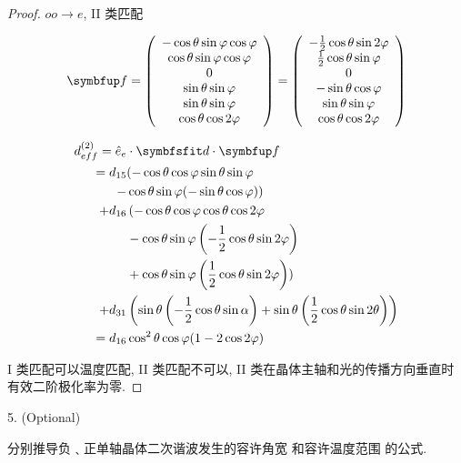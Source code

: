 \begin{proof}
$oo\rightarrow e$, II 类匹配

$$
\Vect{f}=\left(\begin{array}{c}
{-\cos \theta \sin \varphi \cos \varphi} \\
{\cos \theta \sin \varphi \cos \varphi} \\
{0} \\
{\sin \theta \sin \varphi} \\
{\sin \theta \sin \varphi} \\
{\cos \theta \cos 2 \varphi}
\end{array}\right)=\left(\begin{array}{c}
{-\frac{1}{2} \cos \theta \sin 2 \varphi} \\
{\frac{1}{2} \cos \theta \sin \varphi} \\ 
0\\
{-\sin \theta \cos \varphi} \\
{\sin \theta \sin \varphi} \\
{\cos \theta \cos 2 \varphi}
\end{array}\right)
$$

\[
\begin{aligned}
d_{e f f}^{(2)}=\hat{e}_{e}& \cdot \Tens{d} \cdot \Vect{f}\\
=d_{15}&(-\cos \theta \cos \varphi \sin \theta \sin \varphi \\
-& \cos \theta \sin \varphi(-\sin \theta \cos \varphi)) \\
+ d_{16}&\left(-\cos \theta \cos \varphi \cos \theta \cos 2 \varphi\right. \\
&-\cos \theta \sin \varphi\left(-\frac{1}{2} \cos \theta \sin 2 \varphi\right) \\
&+\cos \theta \sin \varphi\left(\frac{1}{2} \cos \theta \sin 2 \varphi\right) ) \\
+ d_{31}&\left(\sin \theta\left(-\frac{1}{2} \cos \theta \sin \alpha\right)+\sin \theta\left(\frac{1}{2} \cos \theta \sin 2 \theta\right)\right) \\
= d_{16}& \cos^2 \theta \cos \varphi(1-2 \cos 2 \varphi)
\end{aligned}
\]

I 类匹配可以温度匹配, II 类匹配不可以, II 类在晶体主轴和光的传播方向垂直时有效二阶极化率为零.
\end{proof}

\begin{exercise}

5. (Optional)

分别推导负﹑正单轴晶体二次谐波发生的容许角宽 和容许温度范围 的公式. 
\end{exercise}

